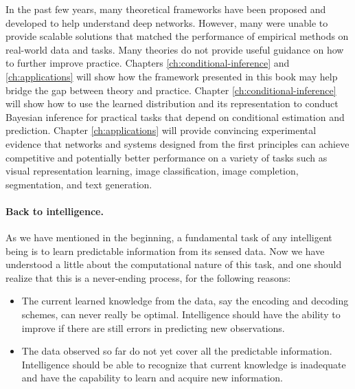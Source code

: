 \documentclass[../../book-main.tex]{subfiles}
\begin{document}
In the past few years, many theoretical frameworks have been proposed and developed to help understand deep networks. However, many were unable to provide scalable solutions that matched the performance of empirical methods on real-world data and tasks. Many theories do not provide useful guidance on how to further improve practice. Chapters \ref{ch:conditional-inference} and  \ref{ch:applications} will show how the framework presented in this book may help bridge the gap between theory and practice. Chapter \ref{ch:conditional-inference} will show how to use the learned distribution and its representation to conduct Bayesian inference for practical tasks that depend on conditional estimation and prediction. Chapter \ref{ch:applications} will provide convincing experimental evidence that networks and systems designed from the first principles can achieve competitive and potentially better performance on a variety of tasks such as visual representation learning,  image classification, image completion, segmentation, and text generation.


\paragraph{Back to intelligence.}
As we have mentioned in the beginning, a fundamental task of any intelligent being is to learn predictable information from its sensed data. Now we have understood a little about the computational nature of this task, and one should realize that this is a never-ending process, for the following reasons:
\begin{itemize}
    \item The current learned knowledge from the data, say the encoding and decoding schemes, can never really be optimal. Intelligence should have the ability to improve if there are still errors in predicting new observations. 
    \item The data observed so far do not yet cover all the predictable information. Intelligence should be able to recognize that current knowledge is inadequate and have the capability to learn and acquire new information.
\end{itemize}
\end{document}
